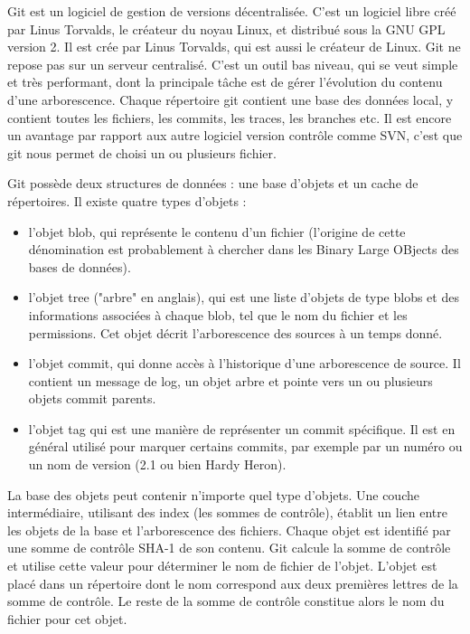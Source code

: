 Git est un logiciel de gestion de versions décentralisée. C'est un logiciel libre créé par Linus Torvalds, le créateur du noyau Linux, et distribué sous la GNU GPL version 2. Il est crée par Linus Torvalds, qui est aussi le créateur de Linux. Git ne repose pas sur un serveur centralisé. C'est un outil bas niveau, qui se veut simple et très performant, dont la principale tâche est de gérer l'évolution du contenu d'une arborescence. Chaque répertoire git contient une base des données local, y contient toutes les fichiers, les commits, les traces, les branches etc. Il est encore un avantage par rapport aux autre logiciel version contrôle comme SVN, c'est que git nous permet de choisi un ou plusieurs fichier. 

Git possède deux structures de données : une base d'objets et un cache de répertoires. Il existe quatre types d'objets :

\begin{itemize}
	\item l'objet blob, qui représente le contenu d'un fichier (l'origine de cette dénomination est probablement à chercher dans les Binary Large OBjects des bases de données).
	\item l'objet tree ("arbre" en anglais), qui est une liste d'objets de type blobs et des informations associées à chaque blob, tel que le nom du fichier et les permissions. Cet objet décrit l'arborescence des sources à un temps donné.
	\item l'objet commit, qui donne accès à l'historique d'une arborescence de source. Il contient un message de log, un objet arbre et pointe vers un ou plusieurs objets commit parents.
	\item l'objet tag qui est une manière de représenter un commit spécifique. Il est en général utilisé pour marquer certains commits, par exemple par un numéro ou un nom de version (2.1 ou bien Hardy Heron).
\end{itemize}

La base des objets peut contenir n'importe quel type d'objets. Une couche intermédiaire, utilisant des index (les sommes de contrôle), établit un lien entre les objets de la base et l'arborescence des fichiers.
Chaque objet est identifié par une somme de contrôle SHA-1 de son contenu. Git calcule la somme de contrôle et utilise cette valeur pour déterminer le nom de fichier de l'objet. L'objet est placé dans un répertoire dont le nom correspond aux deux premières lettres de la somme de contrôle. Le reste de la somme de contrôle constitue alors le nom du fichier pour cet objet.

